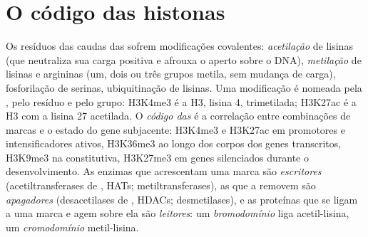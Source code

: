 \section{O código das histonas}

\begin{definition}\label{def:b3:chromatin-epigenetics:histone-code}
Os resíduos das caudas das  sofrem modificações covalentes:
\emph{acetilação} de lisinas (que neutraliza sua carga positiva e
afrouxa o aperto sobre o DNA), \emph{metilação} de lisinas e argininas
(um, dois ou três grupos metila, sem mudança de carga), fosforilação
de serinas, ubiquitinação de lisinas. Uma modificação é nomeada pela
, pelo resíduo e pelo grupo: H3K4me3 é a  H3, lisina 4,
trimetilada; H3K27ac é a H3 com a lisina 27 acetilada. O \emph{código
das } é a correlação entre combinações de marcas e o estado do
gene subjacente: H3K4me3 e H3K27ac em promotores e intensificadores
ativos, H3K36me3 ao longo dos corpos dos genes transcritos, H3K9me3 na
 constitutiva, H3K27me3 em genes silenciados durante o
desenvolvimento. As enzimas que acrescentam uma marca são
\emph{escritores} (acetiltransferases de , HATs;
metiltransferases), as que a removem são \emph{apagadores}
(desacetilases de , HDACs; desmetilases), e as proteínas que
se ligam a uma marca e agem sobre ela são \emph{leitores}: um
\emph{bromodomínio} liga acetil-lisina, um \emph{cromodomínio}
metil-lisina.
\end{definition}

